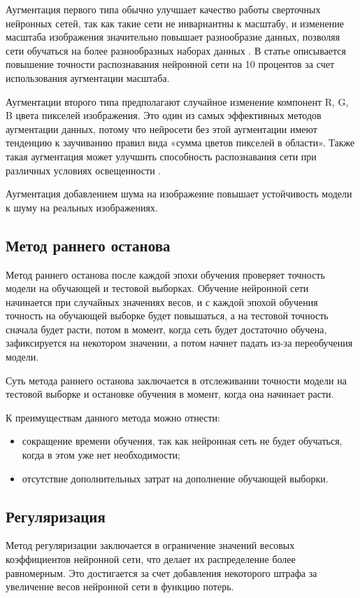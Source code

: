 Аугментация первого типа обычно улучшает качество работы сверточных нейронных сетей, так как такие сети не инвариантны к масштабу, и изменение масштаба изображения значительно повышает разнообразие данных, позволяя сети обучаться на более разнообразных наборах данных \cite{augmentation}. В статье \cite{augmentation1} описывается повышение точности распознавания нейронной сети на 10 процентов за счет использования аугментации масштаба.

Аугментации второго типа предполагают случайное изменение компонент R, G, B цвета пикселей изображения. Это один из самых эффективных методов аугментации данных, потому что нейросети без этой аугментации имеют тенденцию к заучиванию правил вида «сумма цветов пикселей в области». Также такая аугментация может улучшить способность распознавания сети при различных условиях освещенности \cite{augmentation}.

Аугментация добавлением шума на изображение повышает устойчивость модели к шуму на реальных изображениях.

\subsection{Метод раннего останова}
Метод раннего останова после каждой эпохи обучения проверяет точность модели на обучающей и тестовой выборках. Обучение нейронной сети начинается при случайных значениях весов, и с каждой эпохой обучения точность на обучающей выборке будет повышаться, а на тестовой точность сначала будет расти, потом в момент, когда сеть будет достаточно обучена, зафиксируется на некотором значении, а потом начнет падать из-за переобучения модели.

Суть метода раннего останова заключается в отслеживании точности модели на тестовой выборке и остановке обучения в момент, когда она начинает расти.

К преимуществам данного метода можно отнести:
\begin{itemize}
	\item сокращение времени обучения, так как нейронная сеть не будет обучаться, когда в этом уже нет необходимости;
	\item отсутствие дополнительных затрат на дополнение обучающей выборки.
\end{itemize}

\subsection{Регуляризация}
Метод регуляризации заключается в ограничение значений весовых коэффициентов нейронной сети, что делает их распределение более равномерным. Это достигается за счет добавления некоторого штрафа за увеличение весов нейронной сети в функцию потерь.

